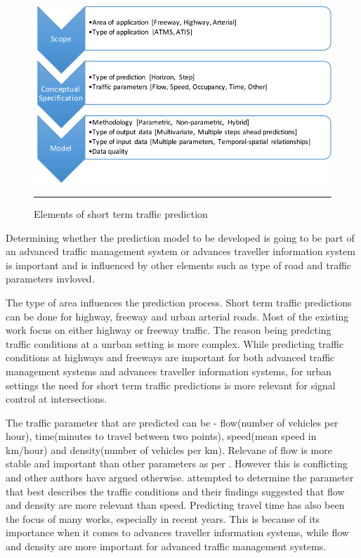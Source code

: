 \begin{figure}[htbp]
  \centering
    \includegraphics[width=\textwidth,height=\textheight,keepaspectratio]{Figures/sttp-process.pdf}
    \rule{35em}{0.5pt}
  \caption[Elements of short term traffic prediction]{Elements of short term traffic prediction}
  \label{fig:sttp-process}
\end{figure}

Determining whether the prediction model to be developed is going to be part of an advanced
traffic management system or advances traveller information system is important and is influenced
by other elements such as type of road and traffic parameters invloved.

The type of area influences the prediction process. Short term traffic predictions can be done for
highway, freeway and urban arterial roads. Most of the existing work focus on either highway or
freeway traffic. The reason being predcting traffic conditions at a unrban setting is more complex.
While predicting traffic conditions at highways and freeways are important for both advanced traffic
management systems and advances traveller information systems, for urban settings the need for short
term traffic predictions is more relevant for signal control at intersections.

The traffic parameter that are predicted can be - flow(number of vehicles per hour), time(minutes
to travel between two points), speed(mean speed in km/hour) and density(number of vehicles per km).
Relevane of flow is more stable and important than other parameters as per \citet{levin1980forecasting}.
However this is conflicting and other authors have argued otherwise. \citet{dougherty1997short} attempted
to determine the parameter that best describes the traffic conditions and their findings suggested that
flow and density are more relevant than speed. Predicting travel time has also been the focus of many
works, especially in recent years. This is because of its importance when it comes to advances traveller
information systems, while flow and density are more important for advanced traffic management systems.

